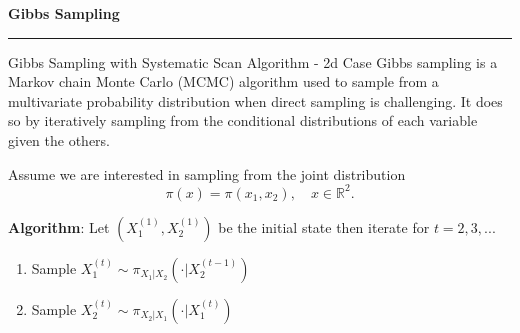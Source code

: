 \begin{frame}
	\vspace{2cm}
	\begin{center}
		{\Huge\textbf{\textcolor{copenhagenred}{Gibbs Sampling}}}
		\vspace{1cm}

		\rule{4cm}{3pt}
		\vspace{2cm}
	\end{center}
\end{frame}


\begin{frame}{Gibbs Sampling with Systematic Scan Algorithm - 2d Case}
    Gibbs sampling is a Markov chain Monte Carlo (MCMC) algorithm used to sample from a
    multivariate probability distribution when direct sampling is challenging. It does so by
    iteratively sampling from the conditional distributions of each variable given the others.

    Assume we are interested in sampling from the joint distribution
    \[
    \pi(x) = \pi(x_1, x_2), \quad x \in \mathbb{R}^2.
    \]

    \textbf{Algorithm}: Let $\left(X_1^{(1)}, X_2^{(1)}\right)$ be the initial state then iterate for $t = 2, 3, ...$

    \begin{enumerate}
        \item Sample $X_1^{(t)} \sim \pi_{X_1|X_2}\left(\cdot | X_2^{(t-1)}\right)$
        \item Sample $X_2^{(t)} \sim \pi_{X_2|X_1}\left(\cdot | X_1^{(t)}\right)$
\end{enumerate}

\end{frame}


